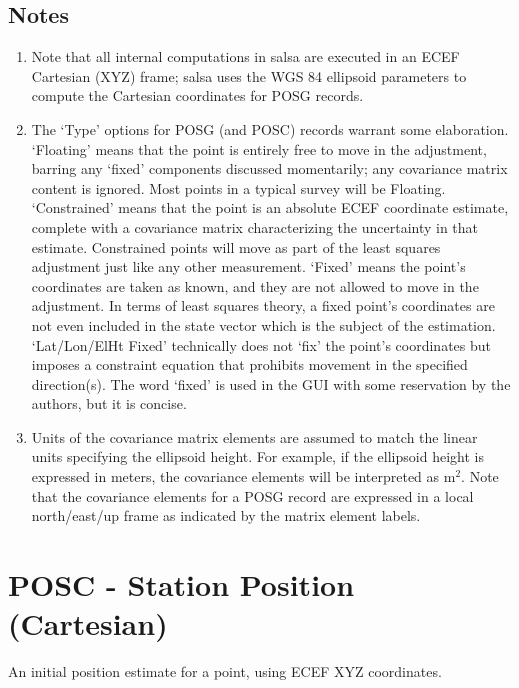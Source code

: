 \subsection*{Notes}
\begin{enumerate}
\item Note that all internal computations in \textsf{salsa} are executed in an ECEF Cartesian (XYZ) frame; \textsf{salsa} uses the WGS 84 ellipsoid parameters to compute the Cartesian coordinates for POSG records.

\item The `Type' options for POSG (and POSC) records warrant some elaboration.  `Floating' means that the point is entirely free to move in the adjustment, barring any `fixed' components discussed momentarily; any covariance matrix content is ignored.  Most points in a typical survey will be Floating.  `Constrained' means that the point is an absolute ECEF coordinate estimate, complete with a covariance matrix characterizing the uncertainty in that estimate.  Constrained points will move as part of the least squares adjustment just like any other measurement.  `Fixed' means the point's coordinates are taken as known, and they are not allowed to move in the adjustment.  In terms of least squares theory, a fixed point's coordinates are not even included in the state vector which is the subject of the estimation.  `Lat/Lon/ElHt Fixed' technically does not `fix' the point's coordinates but imposes a constraint equation that prohibits movement in the specified direction(s).  The word `fixed' is used in the GUI with some reservation by the authors, but it is concise.

\item Units of the covariance matrix elements are assumed to match the linear units specifying the ellipsoid height.  For example, if the ellipsoid height is expressed in meters, the covariance elements will be interpreted as $\mathrm{m}^2$.  Note that the covariance elements for a POSG record are expressed in a local north/east/up frame as indicated by the matrix element labels.

\end{enumerate}


\newpage
\section{POSC - Station Position (Cartesian)}
An initial position estimate for a point, using ECEF XYZ coordinates.
